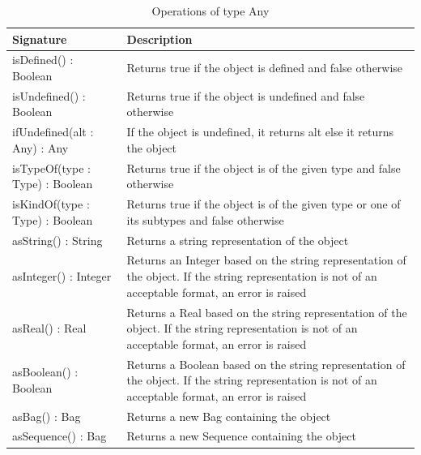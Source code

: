 \begin{longtable} {|p{5.5cm}|p{6.5cm}|}
			
			\caption{Operations of type Any}
			\label{tab:AnyOperations}\\
			
			\hline
							
			\textbf{Signature} & \textbf{Description} \\\hline
			
			isDefined() : Boolean & Returns true if the object is defined and false otherwise \\\hline
			
			isUndefined() : Boolean & Returns true if the object is undefined and false otherwise \\\hline
			
			ifUndefined(alt : Any) : Any & If the object is undefined, it returns alt else it returns the object \\\hline
			
			isTypeOf(type : Type) : Boolean & Returns true if the object is of the given type and false otherwise \\\hline
			
			isKindOf(type : Type) : Boolean & Returns true if the object is of the given type or one of its subtypes and false otherwise \\\hline
			
			asString() : String & Returns a string representation of the object \\\hline
			
			asInteger() : Integer & Returns an Integer based on the string representation of the object. If the string representation is not of an acceptable format, an error is raised \\\hline
			
			asReal() : Real & Returns a Real based on the string representation of the object. If the string representation is not of an acceptable format, an error is raised \\\hline
			
			asBoolean() : Boolean & Returns a Boolean based on the string representation of the object. If the string representation is not of an acceptable format, an error is raised \\\hline
			
			asBag() : Bag & Returns a new Bag containing the object \\\hline
			
			asSequence() : Bag & Returns a new Sequence containing the object \\\hline
			

\end{longtable}
